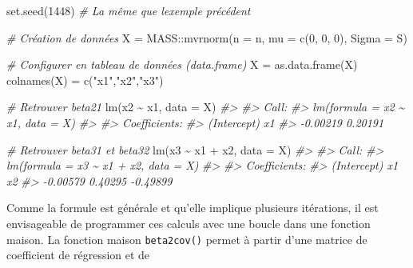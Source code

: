 \documentclass[
]{book}
\newenvironment{Shaded}{}{}
\newcommand{\AttributeTok}[1]{#1}
\newcommand{\CommentTok}[1]{\textit{#1}}
\newcommand{\DecValTok}[1]{#1}
\newcommand{\FunctionTok}[1]{#1}
\newcommand{\NormalTok}[1]{#1}
\newcommand{\OtherTok}[1]{#1}
\newcommand{\SpecialCharTok}[1]{#1}
\newcommand{\StringTok}[1]{#1}
\begin{document}
\begin{Shaded}
\begin{Highlighting}[]
\FunctionTok{set.seed}\NormalTok{(}\DecValTok{1448}\NormalTok{) }\CommentTok{\# La même que l\textquotesingle{}exemple précédent}

\CommentTok{\# Création de données}
\NormalTok{X }\OtherTok{=}\NormalTok{ MASS}\SpecialCharTok{::}\FunctionTok{mvrnorm}\NormalTok{(}\AttributeTok{n =}\NormalTok{ n, }\AttributeTok{mu =} \FunctionTok{c}\NormalTok{(}\DecValTok{0}\NormalTok{, }\DecValTok{0}\NormalTok{, }\DecValTok{0}\NormalTok{), }\AttributeTok{Sigma =}\NormalTok{ S)}

\CommentTok{\# Configurer en tableau de données (data.frame)}
\NormalTok{X }\OtherTok{=} \FunctionTok{as.data.frame}\NormalTok{(X)}
\FunctionTok{colnames}\NormalTok{(X) }\OtherTok{=} \FunctionTok{c}\NormalTok{(}\StringTok{"x1"}\NormalTok{,}\StringTok{"x2"}\NormalTok{,}\StringTok{"x3"}\NormalTok{)}

\CommentTok{\# Retrouver beta21}
\FunctionTok{lm}\NormalTok{(x2 }\SpecialCharTok{\textasciitilde{}}\NormalTok{ x1, }\AttributeTok{data =}\NormalTok{ X)}
\CommentTok{\#\textgreater{} }
\CommentTok{\#\textgreater{} Call:}
\CommentTok{\#\textgreater{} lm(formula = x2 \textasciitilde{} x1, data = X)}
\CommentTok{\#\textgreater{} }
\CommentTok{\#\textgreater{} Coefficients:}
\CommentTok{\#\textgreater{} (Intercept)           x1  }
\CommentTok{\#\textgreater{}    {-}0.00219      0.20191}

\CommentTok{\# Retrouver beta31 et beta32}
\FunctionTok{lm}\NormalTok{(x3 }\SpecialCharTok{\textasciitilde{}}\NormalTok{ x1 }\SpecialCharTok{+}\NormalTok{ x2, }\AttributeTok{data =}\NormalTok{ X)}
\CommentTok{\#\textgreater{} }
\CommentTok{\#\textgreater{} Call:}
\CommentTok{\#\textgreater{} lm(formula = x3 \textasciitilde{} x1 + x2, data = X)}
\CommentTok{\#\textgreater{} }
\CommentTok{\#\textgreater{} Coefficients:}
\CommentTok{\#\textgreater{} (Intercept)           x1           x2  }
\CommentTok{\#\textgreater{}    {-}0.00579      0.40295     {-}0.49899}
\end{Highlighting}
\end{Shaded}

Comme la formule est générale et qu'elle implique plusieurs itérations, il est envisageable de programmer ces calculs avec une boucle dans une fonction maison. La fonction maison \texttt{beta2cov()} permet à partir d'une matrice de coefficient de régression et de
\end{document}
